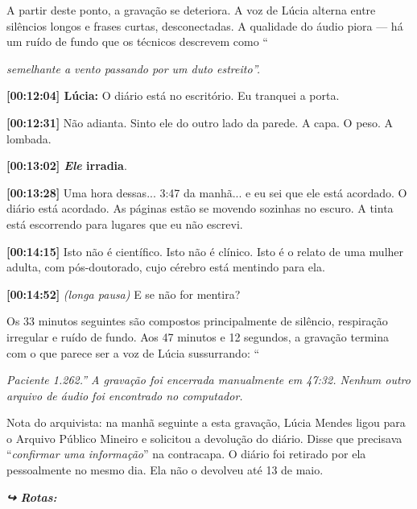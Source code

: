 \noindent A partir deste ponto, a gravação se deteriora. A voz de Lúcia alterna entre silêncios longos e frases curtas, desconectadas. A qualidade do áudio piora --- há um ruído de fundo que os técnicos descrevem como \textquotedblleft{\textit{semelhante a vento passando por um duto estreito\textquotedblright{}.}

\noindent \textbf{[00:12:04] Lúcia:} O diário está no escritório. Eu tranquei a porta.

\noindent \textbf{[00:12:31]} Não adianta. Sinto ele do outro lado da parede. A capa. O peso. A lombada.

\noindent \textbf{[00:13:02]\textit{ Ele }irradia}.

\noindent \textbf{[00:13:28]} Uma hora dessas... 3:47 da manhã... e eu sei que ele está acordado. O diário está acordado. As páginas estão se movendo sozinhas no escuro. A tinta está escorrendo para lugares que eu não escrevi.

\noindent \textbf{[00:14:15]} Isto não é científico. Isto não é clínico. Isto é o relato de uma mulher adulta, com pós-doutorado, cujo cérebro está mentindo para ela.

\noindent \textbf{[00:14:52]} \textit{(longa pausa)} E se não for mentira?

\noindent Os 33 minutos seguintes são compostos principalmente de silêncio, respiração irregular e ruído de fundo. Aos 47 minutos e 12 segundos, a gravação termina com o que parece ser a voz de Lúcia sussurrando: \textquotedblleft{\textit{Paciente 1.262.\textquotedblright{} A gravação foi encerrada manualmente em 47:32. Nenhum outro arquivo de áudio foi encontrado no computador.}

\noindent Nota do arquivista: na manhã seguinte a esta gravação, Lúcia Mendes ligou para o Arquivo Público Mineiro e solicitou a devolução do diário. Disse que precisava \textquotedblleft{\textit{confirmar uma informação}\textquotedblright{}} na contracapa. O diário foi retirado por ela pessoalmente no mesmo dia. Ela não o devolveu até 13 de maio.}

\vspace{0.5em}
\noindent\textit{\textbf{↪ Rotas:}  \rotasep {} \rotasep {} \rotasep {}}

}
